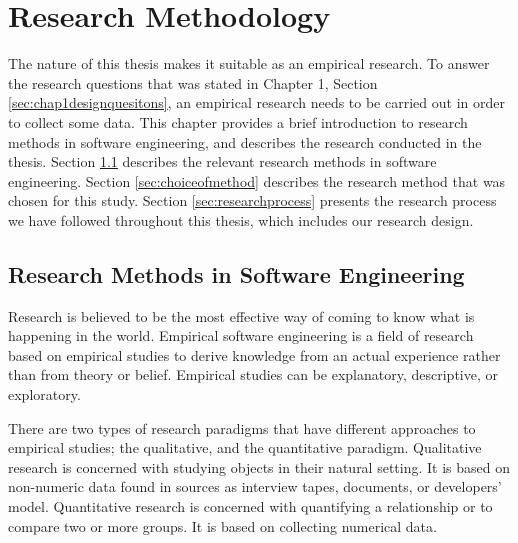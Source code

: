 
\chapter{Research Methodology}



The nature of this thesis makes it suitable as an empirical research. To answer the research questions that was stated in Chapter 1, Section \ref{sec:chap1designquesitons}, an empirical research needs to be carried out in order to collect some data. This chapter provides a brief introduction to research methods in software engineering, and describes the research conducted in the thesis. Section \ref{sec:researchmethodsinsoftwareengineering} describes the relevant research methods in software engineering. Section \ref{sec:choiceofmethod} describes the research method that was chosen for this study. Section \ref{sec:researchprocess} presents the research process we have followed throughout this thesis, which includes our research design.







\section{Research Methods in Software Engineering}
\label{sec:researchmethodsinsoftwareengineering}
 Research is believed to be the most effective way of coming to know what is happening in the world\cite{bassey2003case}. Empirical software engineering is a field of research based on empirical studies to derive knowledge from an actual experience rather than from theory or belief\cite{empirical-research-SE}. Empirical studies can be explanatory, descriptive, or exploratory\cite{Wohlin:2000:ESE:330775}. 

 There are two types of research paradigms that have different approaches to empirical studies\cite{Wohlin:2000:ESE:330775}; the qualitative, and the quantitative paradigm. Qualitative research is concerned with studying objects in their natural setting\cite{Wohlin:2000:ESE:330775}. It is based on non-numeric data found in sources as interview tapes, documents, or developers' model. Quantitative research is concerned with quantifying a relationship or to compare two or more groups\cite{Wohlin:2000:ESE:330775}. It is based on collecting numerical data. 



